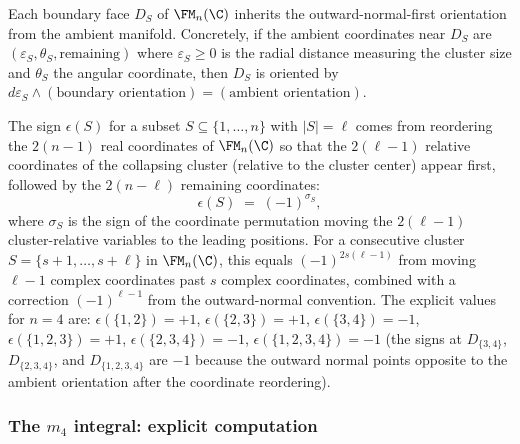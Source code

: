 \begin{definition}%
Each boundary face $D_S$ of $\FM_n(\C)$ inherits the
outward-normal-first orientation from the ambient manifold.
Concretely, if the ambient coordinates near $D_S$ are
$(\varepsilon_S, \theta_S, \text{remaining})$ where
$\varepsilon_S \geq 0$ is the radial distance measuring the
cluster size and $\theta_S$ the angular coordinate, then $D_S$
is oriented by $d\varepsilon_S \wedge (\text{boundary
orientation}) = (\text{ambient orientation})$.

The sign $\epsilon(S)$ for a subset
$S \subseteq \{1,\ldots,n\}$ with $|S| = \ell$ comes
from reordering the $2(n-1)$ real coordinates of
$\FM_n(\C)$ so that the $2(\ell-1)$ relative coordinates
of the collapsing cluster (relative to the cluster center)
appear first, followed by the $2(n-\ell)$ remaining
coordinates:
\begin{equation}%
\epsilon(S)
\;=\;
(-1)^{\sigma_S},
\end{equation}
where $\sigma_S$ is the sign of the coordinate permutation
moving the $2(\ell-1)$ cluster-relative variables to the
leading positions. For a consecutive cluster
$S = \{s{+}1, \ldots, s{+}\ell\}$ in $\FM_n(\C)$, this
equals $(-1)^{2s(\ell-1)}$ from moving $\ell-1$ complex
coordinates past $s$ complex coordinates, combined with a
correction $(-1)^{\ell-1}$ from the outward-normal
convention. The explicit values for $n = 4$ are:
$\epsilon(\{1,2\}) = +1$,
$\epsilon(\{2,3\}) = +1$,
$\epsilon(\{3,4\}) = -1$,
$\epsilon(\{1,2,3\}) = +1$,
$\epsilon(\{2,3,4\}) = -1$,
$\epsilon(\{1,2,3,4\}) = -1$
(the signs at $D_{\{3,4\}}$, $D_{\{2,3,4\}}$, and
$D_{\{1,2,3,4\}}$ are $-1$ because the outward normal
points opposite to the ambient orientation after
the coordinate reordering).
\end{definition}

\subsubsection{The $m_4$ integral: explicit computation}

